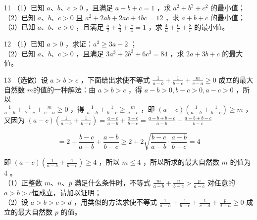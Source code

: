 \documentclass[10pt]{article}
\begin{document}
11 （1）已知 \(a 、 b 、 c>0\) ，且满足 \(a+b+c=1\) ，求 \(a^{2}+b^{2}+c^{2}\) 的最小值；\\
（2）已知 \(a 、 b 、 c>0\) 且 \(a^{2}+2 a b+2 a c+4 b c=12\) ，求 \(a+b+c\) 的最小值；\\
（3）已知 \(a 、 b 、 c>0\) ，且满足 \(\frac{a}{2}+\frac{b}{3}+\frac{c}{4}=1\) ，求 \(\frac{4}{a}+\frac{6}{b}+\frac{8}{c}\) 的最小值。

12 （1）已知 \(a>0\) ，求证：\(a^{3} \geqslant 3 a-2\) ；\\
（2）已知 \(a 、 b 、 c>0\) ，且满足 \(3 a^{3}+2 b^{3}+6 c^{3}=84\) ，求 \(2 a+3 b+c\) 的最大值。

13 （选做）设 \(a>b>c\) ，下面给出求使不等式 \(\frac{1}{a-b}+\frac{1}{b-c}+\frac{m}{c-a} \geqslant 0\) 成立的最大自然数 \(m\)的值的一种解法：由 \(a>b>c\) ，得 \(a-b>0, b-c>0, a-c>0\) ，所以\\
\(\frac{1}{a-b}+\frac{1}{b-c}+\frac{m}{c-a} \geqslant 0\) ，得 \(\frac{1}{a-b}+\frac{1}{b-c} \geqslant \frac{m}{a-c}\) ，即 \((a-c)\left(\frac{1}{a-b}+\frac{1}{b-c}\right) \geqslant m\) ，又因为 \((a-c)\left(\frac{1}{a-b}+\frac{1}{b-c}\right)=\frac{a-c}{a-b}+\frac{a-c}{b-c}=\frac{a-b+b-c}{a-b}+\frac{a-b+b-c}{b-c}\)

\[
=2+\frac{b-c}{a-b}+\frac{a-b}{b-c} \geqslant 2+2 \sqrt{\frac{b-c}{a-b} \cdot \frac{a-b}{b-c}}=4
\]

即 \((a-c)\left(\frac{1}{a-b}+\frac{1}{b-c}\right) \geqslant 4\) ，所以 \(m \leqslant 4\) ，所以所求的最大自然数 \(m\) 的值为 4 。\\
（1）正整数 \(m 、 n 、 p\) 满足什么条件时，不等式 \(\frac{m}{a-b}+\frac{n}{b-c}>\frac{p}{a-c}\) 对任意的 \(a>b>c\)恒成立，请加以证明；\\
（2）设 \(a>b>c>d\) ，用类似的方法求使不等式 \(\frac{1}{a-b}+\frac{1}{b-c}+\frac{1}{c-d}+\frac{p}{d-a} \geqslant 0\) 成立的最大自然数 \(p\) 的值。
\end{document}
